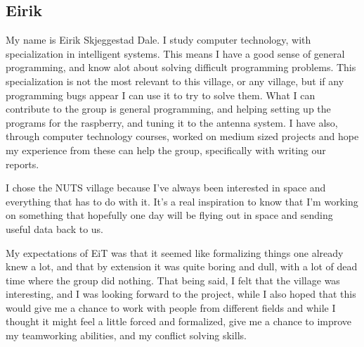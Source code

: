 \subsection{Eirik}
My name is Eirik Skjeggestad Dale. I study computer technology, with specialization in intelligent systems. This means I have a good sense of general programming, and know alot about solving difficult programming problems. This specialization is not the most relevant to this village, or any village, but if any programming bugs appear I can use it to try to solve them. What I can contribute to the group  is general programming, and helping setting up the programs for the raspberry, and tuning it to the antenna system. I have also, through computer technology courses, worked on medium sized projects and hope my experience from these can help the group, specifically with writing our reports.

I chose the NUTS village because I've always been interested in space and everything that has to do with it. It's a real inspiration to know that I'm working on something that hopefully one day will be flying out in space and sending useful data back to us.

My expectations of EiT was that it seemed like formalizing things one already knew a lot, and that by extension it was quite boring and dull, with a lot of dead time where the group did nothing. That being said, I felt that the village was interesting, and I was looking forward to the project, while I also hoped that this would give me a chance to work with people from different fields and while I thought it might feel a little forced and formalized, give me a chance to improve my teamworking abilities, and my conflict solving skills.